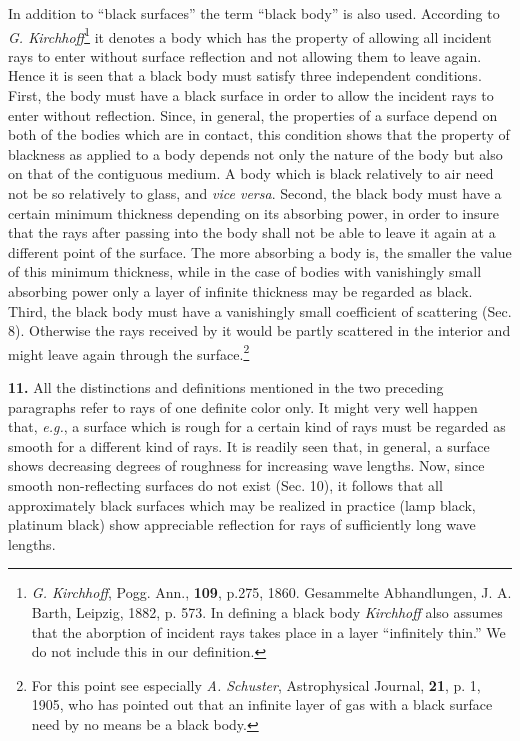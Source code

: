 \documentclass[12pt,oneside]{book}
\begin{document}
In addition to ``black surfaces'' the term ``black body'' is also used. According to \textit{G. Kirchhoff}\footnote{\textit{G. Kirchhoff}, Pogg. Ann., \textbf{109}, p.275, 1860. Gesammelte Abhandlungen, J. A. Barth, Leipzig, 1882, p. 573. In defining a black body \textit{Kirchhoff} also assumes that the aborption of incident rays takes place in a layer ``infinitely thin.'' We do not include this in our definition.} it denotes a body which has the property of allowing all incident rays to enter without surface reflection and not allowing them to leave again. Hence it is seen that a black body must satisfy three independent conditions. First, the body must have a black surface in order to allow the incident rays to enter without reflection. Since, in general, the properties of a surface depend on both of the bodies which are in contact, this condition shows that the property of blackness as applied to a body depends not only the nature of the body but also on that of the contiguous medium. A body which is black relatively to air need not be so relatively to glass, and \textit{vice versa}. Second, the black body must have a certain minimum thickness depending on its absorbing power, in order to insure that the rays after passing into the body shall not be able to leave it again at a different point of the surface. The more absorbing a body is, the smaller the value of this minimum thickness, while in the case of bodies with vanishingly small absorbing power only a layer of infinite thickness may be regarded as black. Third, the black body must have a vanishingly small coefficient of scattering (Sec. 8). Otherwise the rays received by it would be partly scattered in the interior and might leave again through the surface.\footnote{For this point see especially \textit{A. Schuster}, Astrophysical Journal, \textbf{21}, p. 1, 1905, who has pointed out that an infinite layer of gas with a black surface need by no means be a black body.} \par

\textbf{11.} All the distinctions and definitions mentioned in the two preceding paragraphs refer to rays of one definite color only. It might very well happen that, \textit{e.g.}, a surface which is rough for a certain kind of rays must be regarded as smooth for a different kind of rays. It is readily seen that, in general, a surface shows decreasing degrees of roughness for increasing wave lengths. Now, since smooth non-reflecting surfaces do not exist (Sec. 10), it follows that all approximately black surfaces which may be realized in practice (lamp black, platinum black) show appreciable reflection for rays of sufficiently long wave lengths. \par
\end{document}
